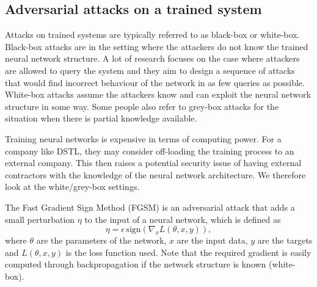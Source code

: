 \subsection{Adversarial attacks on a trained system}

Attacks on trained systems are typically referred to as black-box or white-box. Black-box attacks are in the setting where the attackers do not know the trained neural network structure. A lot of research focuses on the case where attackers are allowed to query the system and they aim to design a sequence of attacks that would find incorrect behaviour of the network in as few queries as possible. White-box attacks assume the attackers know and can exploit the neural network structure in some way. Some people also refer to grey-box attacks for the situation when there is partial knowledge available.

Training neural networks is expensive in terms of computing power. For a company like DSTL, they may consider off-loading the training process to an external company. This then raises a potential security issue of having external contractors with the knowledge of the neural network architecture. We therefore look at the white/grey-box settings.

The Fast Gradient Sign Method (FGSM) \cite{Goodfellow14} is an adversarial attack that adds a small perturbation \(\eta\) to the input of a neural network, which is defined as
\begin{equation}
\eta = \epsilon \, \text{sign}(\nabla_x L(\theta,x,y)),\label{eq:fgsm}
\end{equation}
where \(\theta\) are the parameters of the network, \(x\) are the input data, \(y\) are the targets and \(L(\theta,x,y)\) is the loss function used. Note that the required gradient is easily computed through backpropagation if the network structure is known (white-box).

